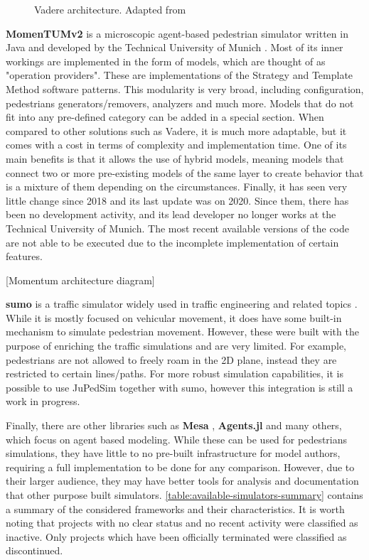 \documentclass[twoside, 11pt]{article}
\begin{document}
\begin{figure}[h]
  \centering
  
  \caption{Vadere architecture. Adapted from \cite{seitzSuperpositionPrincipleConceptual2016}}
  \label{fig:vadere_architecture}
\end{figure}

\textbf{MomenTUMv2} is a microscopic agent-based pedestrian simulator written in Java and developed by the Technical University of Munich \cite{kielarMomenTUMv2ModularExtensible2016}. Most of its inner workings are implemented in the form of models, which are thought of as "operation providers". These are implementations of the Strategy and Template Method software patterns. This modularity is very broad, including configuration, pedestrians generators/removers, analyzers and much more. Models that do not fit into any pre-defined category can be added in a special section. When compared to other solutions such as Vadere, it is much more adaptable, but it comes with a cost in terms of complexity and implementation time. One of its main benefits is that it allows the use of hybrid models, meaning models that connect two or more pre-existing models of the same layer to create behavior that is a mixture of them depending on the circumstances. Finally, it has seen very little change since 2018 and its last update was on 2020. Since them, there has been no development activity, and its lead developer no longer works at the Technical University of Munich. The most recent available versions of the code are not able to be executed due to the incomplete implementation of certain features.

[Momentum architecture diagram]

\textbf{\gls{sumo}} is a traffic simulator widely used in traffic engineering and related topics \cite{SUMO2018}. While it is mostly focused on vehicular movement, it does have some built-in mechanism to simulate pedestrian movement. However, these were built with the purpose of enriching the traffic simulations and are very limited. For example, pedestrians are not allowed to freely roam in the 2D plane, instead they are restricted to certain lines/paths. For more robust simulation capabilities, it is possible to use JuPedSim together with \gls{sumo}, however this integration is still a work in progress.

Finally, there are other libraries such as \textbf{Mesa} \cite{hoevenMesa3Agentbased2025}, \textbf{Agents.jl} \cite{Agents.jl} and many others, which focus on agent based modeling. While these can be used for pedestrians simulations, they have little to no pre-built infrastructure for model authors, requiring a full implementation to be done for any comparison. However, due to their larger audience, they may have better tools for analysis and documentation that other purpose built simulators. \autoref{table:available-simulators-summary} contains a summary of the considered frameworks and their characteristics. It is worth noting that projects with no clear status and no recent activity were classified as inactive. Only projects which have been officially terminated were classified as discontinued.
\end{document}
